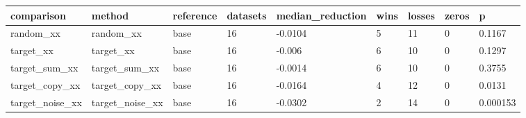 \begin{tabular}{lllllllll}
\toprule
comparison & method & reference & datasets & median\_reduction & wins & losses & zeros & p \\
\midrule
random\_xx & random\_xx & base & 16 & -0.0104 & 5 & 11 & 0 & 0.1167 \\
target\_xx & target\_xx & base & 16 & -0.006 & 6 & 10 & 0 & 0.1297 \\
target\_sum\_xx & target\_sum\_xx & base & 16 & -0.0014 & 6 & 10 & 0 & 0.3755 \\
target\_copy\_xx & target\_copy\_xx & base & 16 & -0.0164 & 4 & 12 & 0 & 0.0131 \\
target\_noise\_xx & target\_noise\_xx & base & 16 & -0.0302 & 2 & 14 & 0 & 0.000153 \\
\bottomrule
\end{tabular}
